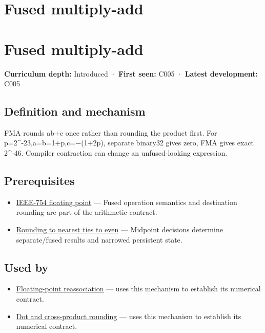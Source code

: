 \hypertarget{appendix-41e8ef22a21e}{}
\section*{Fused multiply-add}
\section{Fused multiply-add}\label{fused-multiply-add}

\textbf{Curriculum depth:} Introduced · \textbf{First seen:} C005 · \textbf{Latest development:} C005

\subsection{Definition and mechanism}\label{definition-and-mechanism}

FMA rounds ab+c once rather than rounding the product first. For p=2\^{}-23,a=b=1+p,c=−(1+2p), separate binary32 gives zero, FMA gives exact 2\^{}-46. Compiler contraction can change an unfused-looking expression.

\subsection{Prerequisites}\label{prerequisites}

\begin{itemize}
\tightlist
\item
  \hyperref[appendix-343615f49ddf]{IEEE-754 floating point} --- Fused operation semantics and destination rounding are part of the arithmetic contract.
\item
  \hyperref[appendix-614afe1de592]{Rounding to nearest ties to even} --- Midpoint decisions determine separate/fused results and narrowed persistent state.
\end{itemize}

\subsection{Used by}\label{used-by}

\begin{itemize}
\tightlist
\item
  \hyperref[appendix-c2ac4a84c283]{Floating-point reassociation} --- uses this mechanism to establish its numerical contract.
\item
  \hyperref[appendix-5aef4f13483a]{Dot and cross-product rounding} --- uses this mechanism to establish its numerical contract.
\end{itemize}

